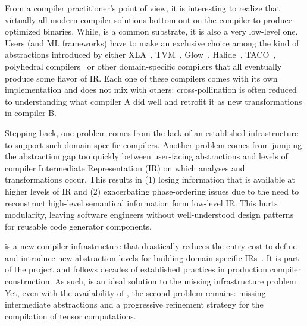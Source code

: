 From a compiler practitioner's point of view, it is interesting to realize that virtually all modern compiler solutions bottom-out on the \LLVM compiler to produce optimized binaries.
While, \LLVM is a common substrate, it is also a very low-level one.
Users (and ML frameworks) have to make an exclusive choice among the kind of abstractions introduced by either XLA~\cite{XLA}, TVM~\cite{chen2018tvm}, Glow~\cite{rotem2018glow}, Halide~\cite{ragan2013halide}, TACO~\cite{kjolstad2017taco}, polyhedral compilers~\cite{vasilache2019next} or other domain-specific compilers that all eventually produce some flavor of \LLVM IR.
Each one of these compilers comes with its own implementation and does not mix with others: cross-pollination is often reduced to understanding what compiler A did well and retrofit it as new transformations in compiler B.

Stepping back, one problem comes from the lack of an established infrastructure to support such domain-specific compilers.
Another problem comes from jumping the abstraction gap too quickly between user-facing abstractions and levels of compiler Intermediate Representation (IR) on which analyses and transformations occur.
This results in (1) losing information that is available at higher levels of IR and (2) exacerbating phase-ordering issues due to the need to reconstruct high-level semantical information form low-level IR.
This hurts modularity, leaving software engineers without well-understood design patterns for reusable code generator components. 

\MLIR is a new compiler infrastructure that drastically reduces the entry cost to define and introduce new abstraction levels for building domain-specific IRs~\cite{lattner2021mlir}.
It is part of the \LLVM project and follows decades of established practices in production compiler construction.
As such, \MLIR is an ideal solution to the missing infrastructure problem.
Yet, even with the availability of \MLIR, the second problem remains: missing intermediate abstractions and a progressive refinement strategy for the compilation of tensor computations.

